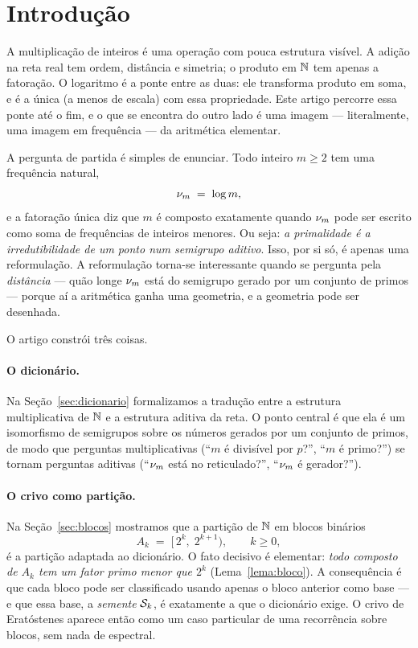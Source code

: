 \section{Introdução}

A multiplicação de inteiros é uma operação com pouca estrutura visível. A adição
na reta real tem ordem, distância e simetria; o produto em $\mathbb{N}$ tem apenas a
fatoração. O logaritmo é a ponte entre as duas: ele transforma produto em soma,
e é a única (a menos de escala) com essa propriedade. Este artigo percorre essa
ponte até o fim, e o que se encontra do outro lado é uma imagem — literalmente,
uma imagem em frequência — da aritmética elementar.

A pergunta de partida é simples de enunciar. Todo inteiro $m \ge 2$ tem uma
frequência natural,
\[
  \nu_{m} \;=\; \log m ,
\]
e a fatoração única diz que $m$ é composto exatamente quando $\nu_{m}$ pode ser
escrito como soma de frequências de inteiros menores. Ou seja: \emph{a
primalidade é a irredutibilidade de um ponto num semigrupo aditivo}. Isso, por si
só, é apenas uma reformulação. A reformulação torna-se interessante quando se
pergunta pela \emph{distância} — quão longe $\nu_{m}$ está do semigrupo gerado
por um conjunto de primos — porque aí a aritmética ganha uma geometria, e a
geometria pode ser desenhada.

O artigo constrói três coisas.

\paragraph{O dicionário.} Na Seção~\ref{sec:dicionario} formalizamos a tradução
entre a estrutura multiplicativa de $\mathbb{N}$ e a estrutura aditiva da reta. O ponto
central é que ela é um isomorfismo de semigrupos sobre os números gerados por um
conjunto de primos, de modo que perguntas multiplicativas (``$m$ é divisível por
$p$?'', ``$m$ é primo?'') se tornam perguntas aditivas (``$\nu_{m}$ está no
reticulado?'', ``$\nu_{m}$ é gerador?'').

\paragraph{O crivo como partição.} Na Seção~\ref{sec:blocos} mostramos que a
partição de $\mathbb{N}$ em blocos binários
\[
  A_k \;=\; [\,2^k,\; 2^{k+1}) , \qquad k \ge 0 ,
\]
é a partição adaptada ao dicionário. O fato decisivo é elementar: \emph{todo
composto de $A_k$ tem um fator primo menor que $2^k$} (Lema~\ref{lema:bloco}). A
consequência é que cada bloco pode ser classificado usando apenas o bloco
anterior como base — e que essa base, a \emph{semente} $\mathcal{S}_k$, é exatamente a
que o dicionário exige. O crivo de Eratóstenes aparece então como um caso
particular de uma recorrência sobre blocos, sem nada de espectral.

